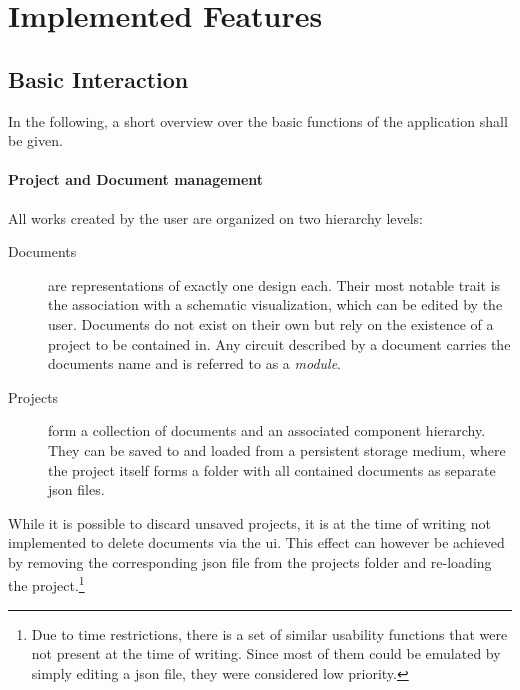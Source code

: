 \section{Implemented Features}
	
\subsection{Basic Interaction}
	\label{sec-basic-interaction}
	In the following, a short overview over the basic functions of the application shall be given.
	
	\paragraph{Project and Document management}
		All works created by the user are organized on two hierarchy levels:

		\begin{description}	
		\item[Documents]
			are representations of exactly one design each.
			Their most notable trait is the association with a schematic visualization, which can be edited by the user.
			Documents do not exist on their own but rely on the existence of a project to be contained in.
			Any circuit described by a document carries the documents name and is referred to as a \emph{module}.
		\item[Projects]
			form a collection of documents and an associated component hierarchy.
			They can be saved to and loaded from a persistent storage medium, where the project itself forms a folder with all contained documents as separate \gls{json} files.
		\end{description}
	
		While it is possible to discard unsaved projects, it is at the time of writing not implemented to delete documents via the \gls{ui}.
		This effect can however be achieved by removing the corresponding \gls{json} file from the projects folder and re-loading the project.\footnote{
			Due to time restrictions, there is a set of similar usability functions that were not present at the time of writing.
			Since most of them could be emulated by simply editing a \gls{json} file, they were considered low priority.
		}
	
